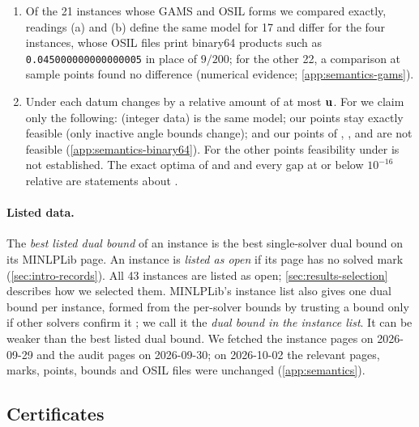 \begin{remark}\label{rem:sem-readings}
\leavevmode
\begin{enumerate}\setlength{\itemsep}{0pt}\setlength{\parsep}{0pt}
\item[(1)] Of the 21 instances whose GAMS and OSIL forms we compared exactly, readings (a) and (b) define the same model for 17 and differ for the four  instances, whose OSIL files print binary64 products such as \texttt{0.045000000000000005} in place of $9/200$; for the other 22, a comparison at sample points found no difference (numerical evidence; \cref{app:semantics-gams}).
\item[(2)] Under  each datum changes by a relative amount of at most $\mathbf{u}$.
For  we claim only the following:  (integer data) is the same model; our  points stay exactly feasible (only inactive angle bounds change); and our points of , ,  and  are not feasible (\cref{app:semantics-binary64}).
For the other points feasibility under  is not established.
The exact optima of  and  and every gap at or below $10^{-16}$ relative are statements about .
\end{enumerate}
\end{remark}

\paragraph{Listed data.}
The \emph{best listed dual bound} of an instance is the best single-solver dual bound on its MINLPLib page.
An instance is \emph{listed as open} if its page has no solved mark (\cref{sec:intro-records}).
All 43 instances are listed as open; \cref{sec:results-selection} describes how we selected them.
MINLPLib's instance list also gives one dual bound per instance, formed from the per-solver bounds by trusting a bound only if other solvers confirm it \citep{vigerske2014-minlplib-2}; we call it the \emph{dual bound in the instance list}.
It can be weaker than the best listed dual bound.
We fetched the instance pages \citep{cache2026-minlplib-pages-for-43-target} on 2026-09-29 and the audit pages on 2026-09-30; on 2026-10-02 the relevant pages, marks, points, bounds and OSIL files were unchanged (\cref{app:semantics}).

\subsection{Certificates}\label{sec:semantics-cert}

